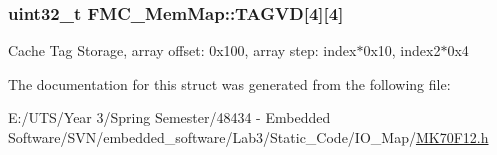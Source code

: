 \subsubsection[{T\+A\+G\+V\+D}]{\setlength{\rightskip}{0pt plus 5cm}uint32\+\_\+t F\+M\+C\+\_\+\+Mem\+Map\+::\+T\+A\+G\+V\+D\mbox{[}4\mbox{]}\mbox{[}4\mbox{]}}\label{struct_f_m_c___mem_map_aceee42cbeff95639e3a10a33f88ecb02}
Cache Tag Storage, array offset\+: 0x100, array step\+: index$\ast$0x10, index2$\ast$0x4 

The documentation for this struct was generated from the following file\+:\begin{DoxyCompactItemize}
\item 
E\+:/\+U\+T\+S/\+Year 3/\+Spring Semester/48434 -\/ Embedded Software/\+S\+V\+N/embedded\+\_\+software/\+Lab3/\+Static\+\_\+\+Code/\+I\+O\+\_\+\+Map/\hyperlink{_m_k70_f12_8h}{M\+K70\+F12.\+h}\end{DoxyCompactItemize}
